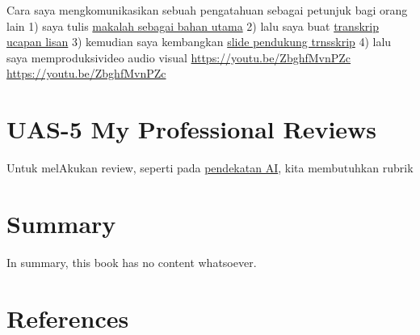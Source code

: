 \documentclass[
  letterpaper,
  DIV=11,
  numbers=noendperiod]{scrreprt}
\newlength{\cslhangindent}
\newenvironment{CSLReferences}[2] %
 {\begin{list}{}{%
  \setlength{\itemindent}{0pt}
  \setlength{\leftmargin}{0pt}
  \setlength{\parsep}{0pt}
  \ifodd #1
   \setlength{\leftmargin}{\cslhangindent}
   \setlength{\itemindent}{-1\cslhangindent}
  \fi
  \setlength{\itemsep}{#2\baselineskip}}}
 {\end{list}}
\begin{document}
Cara saya mengkomunikasikan sebuah pengatahuan sebagai petunjuk bagi
orang lain 1) saya tulis
\href{Rekomendasi\%20Presentasi\%20Efektif(Contoh\%20Makalah).pdf}{makalah
sebagai bahan utama} 2) lalu saya buat
\href{Contoh\%20Transkrip\%20Presentasi.pdf}{transkrip ucapan lisan} 3)
kemudian saya kembangkan
\href{Rekomendasi\%20Presentasi\%20(Contoh\%20Slides).pdf}{slide
pendukung trnsskrip} 4) lalu saya memproduksivideo audio visual
\url{https://youtu.be/ZbghfMvnPZc} \url{https://youtu.be/ZbghfMvnPZc}


\chapter{UAS-5 My Professional
Reviews}\label{uas-5-my-professional-reviews}

Untuk melAkukan review, seperti pada
\href{../My_Personal_Reviews/Doc.5.Mengevaluasi-Esai-Berdasarkan-Rubrik.pdf}{pendekatan
AI}, kita membutuhkan rubrik


\chapter{Summary}\label{summary}

In summary, this book has no content whatsoever.


\chapter*{References}\label{references}


\label{refs}
\begin{CSLReferences}{0}{1}
\end{CSLReferences}
\end{document}
